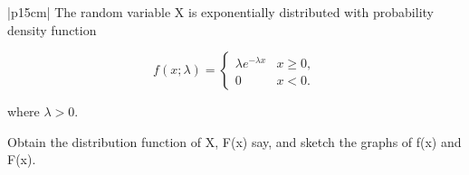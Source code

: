 \documentclass[a4paper,12pt]{article}
\begin{document}
  \begin{table}[ht!]
  \centering
  \begin{tabular}{|p{15cm}|}
  \hline
The random variable X is exponentially distributed with probability density function 
 
 \[{\displaystyle f(x;\lambda )={\begin{cases}\lambda e^{-\lambda x}&x\geq 0,\\0&x<0.\end{cases}}} 
\]

 
  where $\lambda > 0$. 
 
  Obtain the distribution function of X, F(x) say, and sketch the graphs of f(x) and F(x). 
 \\ \hline 
   \end{tabular}
 \end{table}
 
\end{document}
